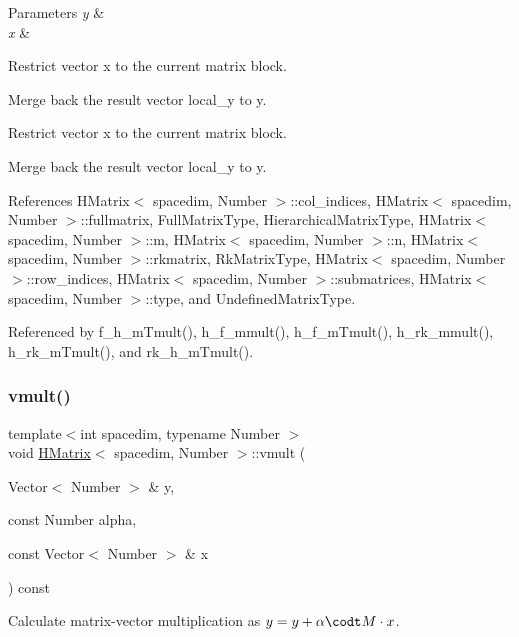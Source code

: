 \begin{DoxyParams}{Parameters}
{\em y} & \\
\hline
{\em x} & \\
\hline
\end{DoxyParams}
Restrict vector x to the current matrix block.

Merge back the result vector {\ttfamily local\+\_\+y} to {\ttfamily y}.

Restrict vector x to the current matrix block.

Merge back the result vector {\ttfamily local\+\_\+y} to {\ttfamily y}.

References H\+Matrix$<$ spacedim, Number $>$\+::col\+\_\+indices, H\+Matrix$<$ spacedim, Number $>$\+::fullmatrix, Full\+Matrix\+Type, Hierarchical\+Matrix\+Type, H\+Matrix$<$ spacedim, Number $>$\+::m, H\+Matrix$<$ spacedim, Number $>$\+::n, H\+Matrix$<$ spacedim, Number $>$\+::rkmatrix, Rk\+Matrix\+Type, H\+Matrix$<$ spacedim, Number $>$\+::row\+\_\+indices, H\+Matrix$<$ spacedim, Number $>$\+::submatrices, H\+Matrix$<$ spacedim, Number $>$\+::type, and Undefined\+Matrix\+Type.



Referenced by f\+\_\+h\+\_\+m\+Tmult(), h\+\_\+f\+\_\+mmult(), h\+\_\+f\+\_\+m\+Tmult(), h\+\_\+rk\+\_\+mmult(), h\+\_\+rk\+\_\+m\+Tmult(), and rk\+\_\+h\+\_\+m\+Tmult().

\mbox{\label{classHMatrix_a21ca2a043c8a02a531d5d08437356310}} 
\subsubsection{\texorpdfstring{vmult()}{vmult()}\hspace{0.1cm}{\footnotesize\ttfamily [2/4]}}
{\footnotesize\ttfamily template$<$int spacedim, typename Number $>$ \\
void \hyperlink{classHMatrix}{H\+Matrix}$<$ spacedim, Number $>$\+::vmult (\begin{DoxyParamCaption}\item[{Vector$<$ Number $>$ \&}]{y,  }\item[{const Number}]{alpha,  }\item[{const Vector$<$ Number $>$ \&}]{x }\end{DoxyParamCaption}) const}

Calculate matrix-\/vector multiplication as $y = y + \alpha \codt M \cdot x$.


